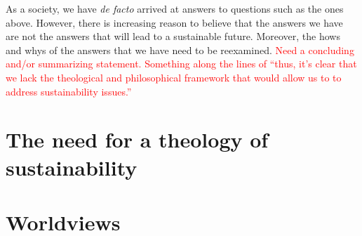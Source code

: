 \documentclass[12pt]{article}
\newcommand{\ins}[1]{\textcolor{red}{#1}}
\begin{document}
As a society, we have \emph{de facto} arrived at answers to questions such as the ones above. However, 
there is increasing reason to believe that the answers we have are not the answers that will lead to a sustainable future.
Moreover, the hows and whys of the answers that we have need to be reexamined.
\ins{Need a concluding and/or summarizing statement. Something along the lines of ``thus, it's clear that we lack the theological
and philosophical framework that would allow us to to address sustainability issues.''}



\section{The need for a theology of sustainability}
\label{sec:need_for_theology_of_sustainability}



\section{Worldviews}
\label{sec:worldviews}


%
\end{document}
